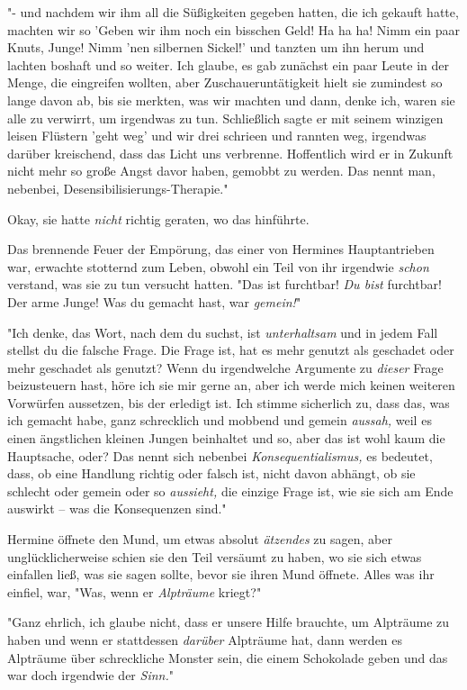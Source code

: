 {"- und nachdem wir ihm all die Süßigkeiten gegeben hatten, die ich gekauft hatte, machten wir so 'Geben wir ihm noch ein bisschen Geld! Ha ha ha! Nimm ein paar Knuts, Junge! Nimm 'nen silbernen Sickel!' und tanzten um ihn herum und lachten boshaft und so weiter. Ich glaube, es gab zunächst ein paar Leute in der Menge, die eingreifen wollten, aber Zuschaueruntätigkeit hielt sie zumindest so lange davon ab, bis sie merkten, was wir machten und dann, denke ich, waren sie alle zu verwirrt, um irgendwas zu tun. Schließlich sagte er mit seinem winzigen leisen Flüstern 'geht weg' und wir drei schrieen und rannten weg, irgendwas darüber kreischend, dass das Licht uns verbrenne. Hoffentlich wird er in Zukunft nicht mehr so große Angst davor haben, gemobbt zu werden. Das nennt man, nebenbei, Desensibilisierungs-Therapie."

Okay, sie hatte \emph{nicht} richtig geraten, wo das hinführte.

Das brennende Feuer der Empörung, das einer von Hermines Hauptantrieben war, erwachte stotternd zum Leben, obwohl ein Teil von ihr irgendwie \emph{schon} verstand, was sie zu tun versucht hatten. "Das ist furchtbar! \emph{Du bist} furchtbar! Der arme Junge! Was du gemacht hast, war \emph{gemein!}"

"Ich denke, das Wort, nach dem du suchst, ist \emph{unterhaltsam} und in jedem Fall stellst du die falsche Frage. Die Frage ist, hat es mehr genutzt als geschadet oder mehr geschadet als genutzt? Wenn du irgendwelche Argumente zu \emph{dieser} Frage beizusteuern hast, höre ich sie mir gerne an, aber ich werde mich keinen weiteren Vorwürfen aussetzen, bis der erledigt ist. Ich stimme sicherlich zu, dass das, was ich gemacht habe, ganz schrecklich und mobbend und gemein \emph{aussah,} weil es einen ängstlichen kleinen Jungen beinhaltet und so, aber das ist wohl kaum die Hauptsache, oder? Das nennt sich nebenbei \emph{Konsequentialismus,} es bedeutet, dass, ob eine Handlung richtig oder falsch ist, nicht davon abhängt, ob sie schlecht oder gemein oder so \emph{aussieht,} die einzige Frage ist, wie sie sich am Ende auswirkt -- was die Konsequenzen sind."

Hermine öffnete den Mund, um etwas absolut \emph{ätzendes} zu sagen, aber unglücklicherweise schien sie den Teil versäumt zu haben, wo sie sich etwas einfallen ließ, was sie sagen sollte, bevor sie ihren Mund öffnete. Alles was ihr einfiel, war, "Was, wenn er \emph{Alpträume} kriegt?"

"Ganz ehrlich, ich glaube nicht, dass er unsere Hilfe brauchte, um Alpträume zu haben und wenn er stattdessen \emph{darüber} Alpträume hat, dann werden es Alpträume über schreckliche Monster sein, die einem Schokolade geben und das war doch irgendwie der \emph{Sinn.}"

}
